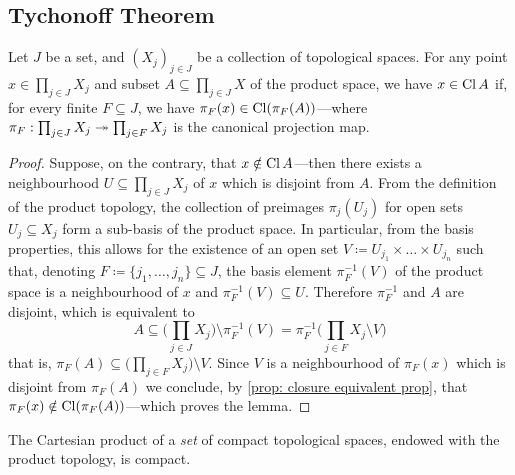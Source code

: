 \subsection{Tychonoff Theorem}

\begin{lemma}
    \label{lem:tychonoff-theorem-pre-lemma}
    Let \(J\) be a set, and \((X_{j})_{j \in J}\) be a collection of topological
    spaces. For any point \(x \in \prod_{j \in J} X_j\) and subset
    \(A \subseteq \prod_{j \in J} X\) of the product space, we have \(x \in \operatorname{Cl} A\)
    if, for every finite \(F \subseteq J\), we have
    \(\pi_F(x) \in \operatorname{Cl}(\pi_F(A))\)---where
    \(\pi_F: \prod_{j \in J} X_j \twoheadrightarrow \prod_{j \in F} X_j\) is the canonical
    projection map.
\end{lemma}

\begin{proof}
    Suppose, on the contrary, that \(x \notin \operatorname{Cl} A\)---then there exists a
    neighbourhood \(U \subseteq \prod_{j \in J} X_j\) of \(x\) which is disjoint
    from \(A\). From the definition of the product topology, the collection of
    preimages \(\pi_j(U_j)\) for open sets \(U_j \subseteq X_j\) form a sub-basis of
    the product space. In particular, from the basis properties, this allows for the
    existence of an open set \(V \coloneq U_{j_1} \times \dots \times U_{j_n}\) such
    that, denoting \(F \coloneq \{j_1, \dots, j_n\} \subseteq J\), the basis element
    \(\pi^{-1}_F(V)\) of the product space is a neighbourhood of \(x\) and
    \(\pi_F^{-1}(V) \subseteq U\). Therefore \(\pi_F^{-1}\) and \(A\) are disjoint,
    which is equivalent to
    \[A \subseteq \bigg( \prod_{j \in J} X_j \bigg) \setminus \pi_F^{-1}(V) =
        \pi_F^{-1}\bigg( \prod_{j \in F} X_j \setminus V \bigg)
    \]
    that is, \(\pi_F(A) \subseteq \big( \prod_{j \in F} X_j \big) \setminus
    V\). Since \(V\) is a neighbourhood of \(\pi_F(x)\) which is disjoint from
    \(\pi_F(A)\) we conclude, by \cref{prop: closure equivalent prop}, that
    \(\pi_F(x) \notin \operatorname{Cl}(\pi_F(A))\)---which proves the lemma.
\end{proof}

\begin{theorem}[Tychonoff]
    \label{thm:tychonoff-theorem}
    The Cartesian product of a \emph{set} of compact topological spaces, endowed
    with the product topology, is compact.
\end{theorem}

